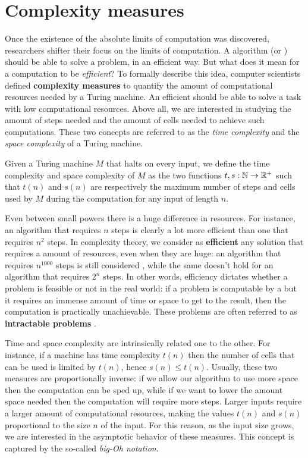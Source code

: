 \section{Complexity measures}

Once the existence of the absolute limits of computation was discovered, researchers shifter their focus on the  limits of computation. A  algorithm (or \TM) should be able to solve a problem, in an efficient way. But what does it mean for a computation to be \textit{efficient}? To formally describe this idea, computer scientists defined \textbf{complexity measures} to quantify the amount of computational resources needed by a Turing machine. An efficient \TM should be able to solve a task with low computational resources. Above all, we are interested in studying the amount of steps needed and the amount of cells needed to achieve such computations. These two concepts are referred to as the \textit{time complexity} and the \textit{space complexity} of a Turing machine.

\begin{definition}
 Given a Turing machine $M$ that halts on every input, we define the time complexity and space complexity of $M$ as the two functions $t, s : \mathbb{N} \to \mathbb{R}^+$ such that $t(n)$ and $s(n)$ are respectively the maximum number of steps and cells used by $M$ during the computation for any input of length $n$.
\end{definition}

Even between small powers there is a huge difference in resources. For instance, an algorithm that requires $n$ steps is clearly a lot more efficient than one that requires $n^2$ steps. In complexity theory, we consider as \textbf{efficient} any solution that requires a  amount of resources, even when they are huge: an algorithm that requires $n^{1000}$ steps is still considered , while the same doesn't hold for an algorithm that requires $2^n$ steps. In other words, efficiency dictates whether a problem is feasible or not in the real world: if a problem is computable by a \TM but it requires an immense amount of time or space to get to the result, then the computation is practically unachievable. These problems are often referred to as \textbf{intractable problems} \cite{complexity_arora_barak,sipser_computation}.

Time and space complexity are intrinsically related one to the other. For instance, if a machine has time complexity $t(n)$ then the number of cells that can be used is limited by $t(n)$, hence $s(n) \leq t(n)$. Usually, these two measures are proportionally inverse: if we allow our algorithm to use more space then the computation can be sped up, while if we want to lower the amount space needed then the computation will require more steps. Larger inputs require a larger amount of computational resources, making the values $t(n)$ and $s(n)$ proportional to the size $n$ of the input. For this reason, as the input size grows, we are interested in the asymptotic behavior of these measures. This concept is captured by the so-called \textit{big-Oh notation}.

